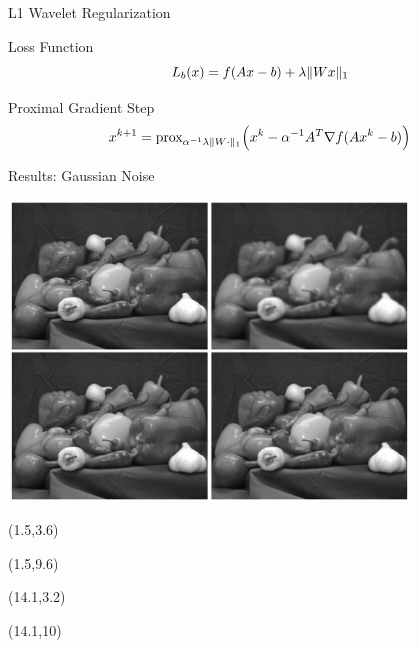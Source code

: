 \documentclass[12pt]{beamer}
\newcommand{\prox}{\text{prox}}
\begin{document}
\begin{frame}{L1 Wavelet Regularization}
\begin{block}{Loss Function}
\[ L_b(x) = f(Ax-b) + \lambda \| Wx \|_1 \vspace{1ex} \]
\end{block}

\vspace{2ex}
\begin{block}{Proximal Gradient Step}
\[ x^{k+1} = \prox_{\alpha^{-1}\lambda \| W \cdot \|_1} \Big(x^k - \alpha^{-1} A^T\nabla f (Ax^k - b)\Big) \vspace{1ex} \]
\end{block}
\end{frame}

\begin{frame}{Results: Gaussian Noise}
\begin{center}
\vspace{-3 mm}
\includegraphics[width = 0.8\textwidth]{../figures/waveletGaussian.pdf} 
\end{center}

\begin{textblock}{5}(1.5,3.6)
\end{textblock}

\begin{textblock}{5}(1.5,9.6)
\end{textblock}

\begin{textblock}{5}(14.1,3.2)
\end{textblock}

\begin{textblock}{5}(14.1,10)
\end{textblock}
\end{frame}
\end{document}
